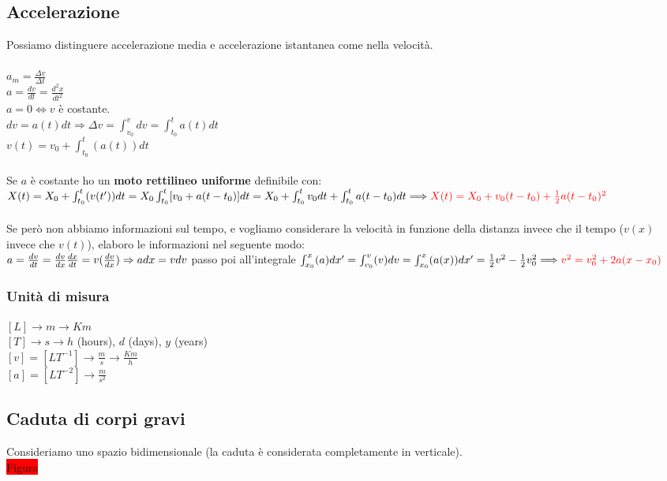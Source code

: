 \documentclass[a4paper,12pt]{report}
\begin{document}
	\subsection{Accelerazione}
	Possiamo distinguere accelerazione media e accelerazione istantanea come nella velocità.\\\\
	$a_{m} = \frac{\Delta v}{\Delta t}$\\
	$a = \frac{dv}{dt} = \frac{d^2x}{dt^2}$\\
	$a = 0 \Longleftrightarrow v$ è costante.\\
	$dv = a(t)dt \Longrightarrow \Delta v = \int_{v_0}^{v}dv = \int_{t_0}^{t}a(t)dt$\\
	$v(t) = v_0 + \int_{t_0}^{t}(a(t))dt$\\\\
	Se $a$ è costante ho un \textbf{moto rettilineo uniforme} definibile con: $X(t) = X_{0} + \int_{t_{0}}^{t}(v(t'))dt = X_0 \int_{t_0}^{t}[v_0 + a(t-t_0)]dt = X_0 + \int_{t_0}^{t}v_0dt + \int_{t_0}^{t}a(t - t_0)dt \Longrightarrow \mathcolor{red}{X(t) = X_0 + v_0(t - t_0) + \frac{1}{2}a(t - t_0)^2}$\\\\
	Se però non abbiamo informazioni sul tempo, e vogliamo considerare la velocità in funzione della distanza invece che il tempo ($v(x)$ invece che $v(t)$), elaboro le informazioni nel seguente modo:\\
	$a = \frac{dv}{dt} = {\frac{dv}{dx}\frac{dx}{dt}} = v(\frac{dv}{dx}) \Rightarrow\\adx = vdv$ passo poi all'integrale $\int_{x_0}^{x}(a)dx' = \int_{v_0}^{v}(v)dv = \int_{x_0}^{x}(a(x))dx' = \frac{1}{2}v^2 - \frac{1}{2}v^2_{0} \Longrightarrow\\\mathcolor{red}{v^2 = v^2_0 + 2a(x -x_0)}$
	\subsubsection{Unità di misura}
	$[L] \longrightarrow m \rightarrow Km$\\
	$[T] \longrightarrow s \rightarrow h$ (hours), $d$ (days), $y$ (years)\\
	$[v] = [LT^{-1}] \longrightarrow \frac{m}{s} \rightarrow \frac{Km}{h}$\\
	$[a] = [LT^{-2}] \longrightarrow \frac{m}{s^2}$
	\subsection{Caduta di corpi gravi}
	Consideriamo uno spazio bidimensionale (la caduta è considerata completamente in verticale).\\
	\colorbox{red}{Figura}\\
	
\end{document}
